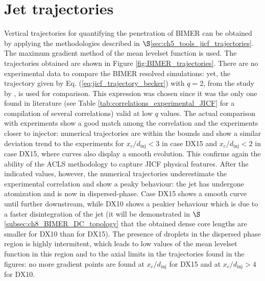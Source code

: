 \section{Jet trajectories}

Vertical trajectories for quantifying the penetration of BIMER can be obtained by applying the methodologies described in $\S$\ref{sec:ch5_tools_jicf_trajectories}. The maximum gradient method of the mean levelset function is used. The trajectories obtained are shown in Figure \ref{fig:BIMER_trajectories}. There are no experimental data to compare the BIMER resolved simulations: yet, the trajectory given by Eq. (\ref{eq:jicf_trajectory_becker}) with $q = 2$, from the study by , is used for comparison. This expression was chosen since it was the only one found in literature (see Table \ref{tab:correlations_experimental_JICF} for a compilation of several correlations) valid at low $q$ values. The actual comparison with experiments show a good match among the correlation and the experiments closer to injector: numerical trajectories are within the bounds and show a similar deviation trend to the experiments for $x_c/d_\mathrm{inj} < 3$ in case DX15 and $x_c/d_\mathrm{inj} < 2$ in case DX15, where curves also display a smooth evolution. This confirms again the ability of the ACLS methodology to capture JICF physical features. After the indicated values, however, the numerical trajectories underestimate the experimental correlation and show a peaky behaviour: the jet has undergone atomization and is now in dispersed-phase. Case DX15 shows a smooth curve until further downstream, while DX10 shows a peakier behaviour which is due to a faster disintegration of the jet (it will be demonstrated in $\S$\ref{subsec:ch8_BIMER_DC_topology} that the obtained dense core lengths are smaller for DX10 than for DX15). The presence of droplets in the dispersed phase region is highly intermitent, which leads to low values of the mean levelset function in this region and to the axial limits in the trajectories found in the figures: no more gradient points are found at $x_c / d_\mathrm{inj}$ for DX15 and at $x_c / d_\mathrm{inj} > 4$ for DX10.


